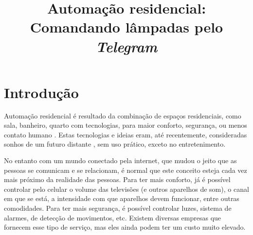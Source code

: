 \documentclass[12pt,journal,compsoc]{IEEEtran}
\begin{document}
\title{Automação residencial:\\Comandando lâmpadas pelo \emph{Telegram}}

\author{
}


\maketitle

\section{Introdução}
Automação residencial é resultado da combinação de espaços residenciais, como sala, banheiro, quarto com tecnologias, para maior conforto, segurança, ou menos contato humano \cite{moraes2001using}. Estas tecnologias e ideias eram, até recentemente, consideradas sonhos de um futuro distante \cite{GHAFFARIANHOSEINI2013593}, sem uso prático, exceto no entretenimento.

No entanto com um mundo conectado pela internet, que mudou o jeito que as pessoas se comunicam e se relacionam, é normal que este conceito esteja cada vez mais próximo da realidade das pessoas. Para ter mais conforto, já é possível controlar pelo celular o volume das televisões (e outros aparelhos de som), o canal em que se está, a intensidade com que aparelhos devem funcionar, entre outras comodidades. Para ter mais segurança, é possível controlar luzes, sistema de alarmes, de detecção de movimentos, etc. Existem diversas empresas que fornecem esse tipo de serviço, mas eles ainda podem ter um custo muito elevado.
\end{document}
